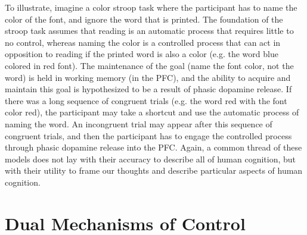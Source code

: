 \documentclass[phd,appendix,figures]{uithesis}
\begin{document}
To illustrate, imagine a color stroop task where the participant has to name the color of the font, and ignore the word that is printed.
The foundation of the stroop task assumes that reading is an automatic process that requires little to no control, whereas naming the color is a controlled process that can act in opposition to reading if the printed word is also a color (e.g. the word blue colored in red font).
The maintenance of the goal (name the font color, not the word) is held in working memory (in the PFC), and the ability to acquire and maintain this goal is hypothesized to be a result of phasic dopamine release. 
If there was a long sequence of congruent trials (e.g. the word red with the font color red), the participant may take a shortcut and use the automatic process of naming the word.
An incongruent trial may appear after this sequence of congruent trials, and then the participant has to engage the controlled process through phasic dopamine release into the PFC.
Again, a common thread of these models does not lay with their accuracy to describe all of human cognition, but with their utility to frame our thoughts and describe particular aspects of human cognition. 




\section{Dual Mechanisms of Control}
\end{document}
